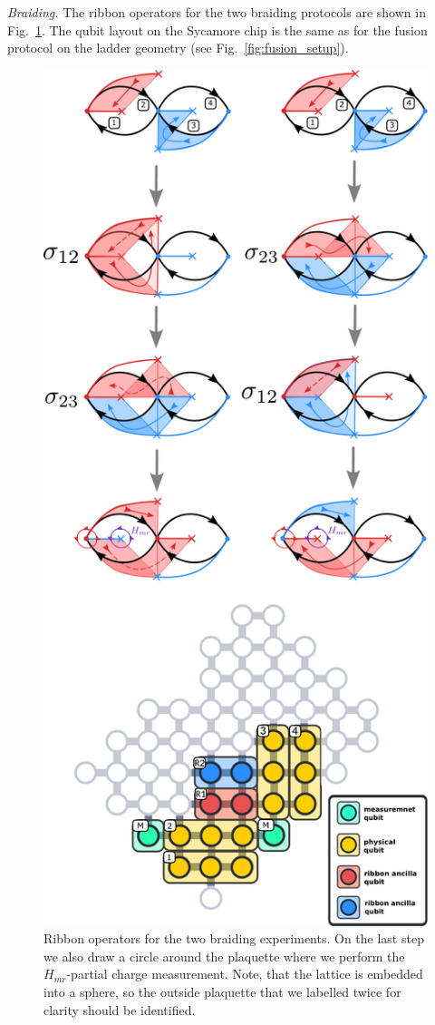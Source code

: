 \documentclass[a4paper,twocolumn,11pt, accepted=2024-06-14]{quantumarticle}
\begin{document}
\emph{Braiding.} The ribbon operators for the two braiding protocols are shown in Fig.~\ref{fig:braiding_setup}. The qubit layout on the Sycamore chip is the same as for the fusion protocol on the ladder geometry (see Fig.~\ref{fig:fusion_setup}).
\begin{figure}
	\centering
	\includegraphics[width=\linewidth]{Figures/braiding_setup.pdf}
	\caption{Ribbon operators for the two braiding experiments. On the last step we also draw a circle around the plaquette where we perform the $H_{mr}$-partial charge measurement. Note, that the lattice is embedded into a sphere, so the outside plaquette that we labelled twice for clarity should be identified.}
	\label{fig:braiding_setup}
\end{figure}
\end{document}
